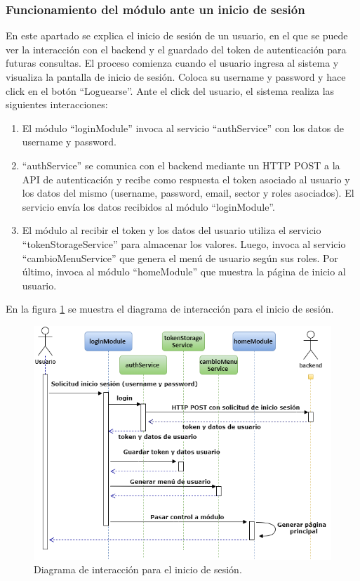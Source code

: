 \subsubsection{Funcionamiento del módulo ante un inicio de sesión}

En este apartado se explica el inicio de sesión de un usuario, en el que se puede ver la interacción con el backend y el guardado del token de autenticación para futuras consultas.
El proceso comienza cuando el usuario ingresa al sistema y visualiza la pantalla de inicio de sesión. Coloca su username y password y hace click en el botón “Loguearse”. Ante el click del usuario, el sistema realiza las siguientes interacciones:

\begin{enumerate}
\item El módulo ``loginModule'' invoca al servicio ``authService'' con los datos de username y password.
\item ``authService'' se comunica con el backend mediante un HTTP POST a la API de autenticación y recibe como respuesta el token asociado al usuario y los datos del mismo (username, password, email, sector y roles asociados). El servicio envía los datos recibidos al módulo ``loginModule''.
\item El módulo al recibir el token y los datos del usuario utiliza el servicio ``tokenStorageService'' para almacenar los valores. Luego, invoca al servicio ``cambioMenuService'' que genera el menú de usuario según sus roles. Por último, invoca al módulo ``homeModule'' que muestra la página de inicio al usuario. 
\end{enumerate}

En la figura \ref{fig:inisioSesionInteraccion} se muestra el diagrama de interacción para el inicio de sesión.

\begin{figure}[ht]
	\centering
	\includegraphics[width=1\textwidth]{./Figures/inisioSesionInteraccion.png}
	\caption{Diagrama de interacción para el inicio de sesión.}
	\label{fig:inisioSesionInteraccion}
\end{figure}

